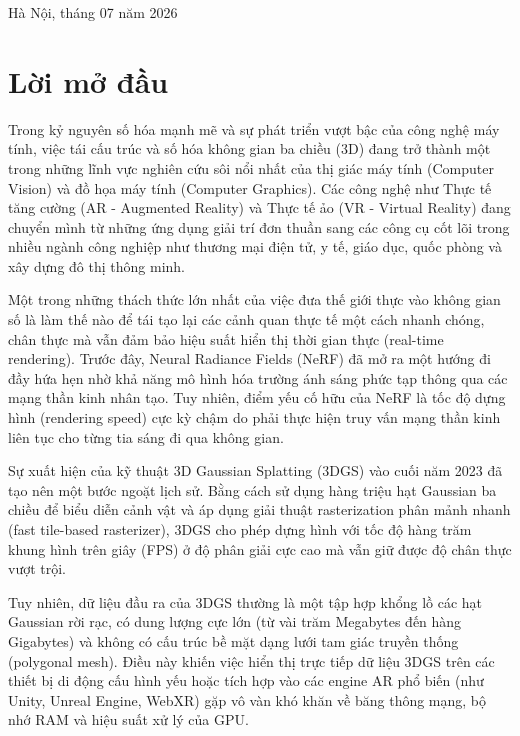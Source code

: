 \documentclass[a4paper,12pt]{report}
\begin{document}
\begin{titlepage}
    \large Hà Nội, tháng 07 năm 2026
\end{titlepage}

\chapter*{Lời mở đầu}

Trong kỷ nguyên số hóa mạnh mẽ và sự phát triển vượt bậc của công nghệ máy tính, việc tái cấu trúc và số hóa không gian ba chiều (3D) đang trở thành một trong những lĩnh vực nghiên cứu sôi nổi nhất của thị giác máy tính (Computer Vision) và đồ họa máy tính (Computer Graphics). Các công nghệ như Thực tế tăng cường (AR - Augmented Reality) và Thực tế ảo (VR - Virtual Reality) đang chuyển mình từ những ứng dụng giải trí đơn thuần sang các công cụ cốt lõi trong nhiều ngành công nghiệp như thương mại điện tử, y tế, giáo dục, quốc phòng và xây dựng đô thị thông minh.

Một trong những thách thức lớn nhất của việc đưa thế giới thực vào không gian số là làm thế nào để tái tạo lại các cảnh quan thực tế một cách nhanh chóng, chân thực mà vẫn đảm bảo hiệu suất hiển thị thời gian thực (real-time rendering). Trước đây, Neural Radiance Fields (NeRF) đã mở ra một hướng đi đầy hứa hẹn nhờ khả năng mô hình hóa trường ánh sáng phức tạp thông qua các mạng thần kinh nhân tạo. Tuy nhiên, điểm yếu cố hữu của NeRF là tốc độ dựng hình (rendering speed) cực kỳ chậm do phải thực hiện truy vấn mạng thần kinh liên tục cho từng tia sáng đi qua không gian.

Sự xuất hiện của kỹ thuật 3D Gaussian Splatting (3DGS) vào cuối năm 2023 đã tạo nên một bước ngoặt lịch sử. Bằng cách sử dụng hàng triệu hạt Gaussian ba chiều để biểu diễn cảnh vật và áp dụng giải thuật rasterization phân mảnh nhanh (fast tile-based rasterizer), 3DGS cho phép dựng hình với tốc độ hàng trăm khung hình trên giây (FPS) ở độ phân giải cực cao mà vẫn giữ được độ chân thực vượt trội.

Tuy nhiên, dữ liệu đầu ra của 3DGS thường là một tập hợp khổng lồ các hạt Gaussian rời rạc, có dung lượng cực lớn (từ vài trăm Megabytes đến hàng Gigabytes) và không có cấu trúc bề mặt dạng lưới tam giác truyền thống (polygonal mesh). Điều này khiến việc hiển thị trực tiếp dữ liệu 3DGS trên các thiết bị di động cấu hình yếu hoặc tích hợp vào các engine AR phổ biến (như Unity, Unreal Engine, WebXR) gặp vô vàn khó khăn về băng thông mạng, bộ nhớ RAM và hiệu suất xử lý của GPU.
\end{document}
